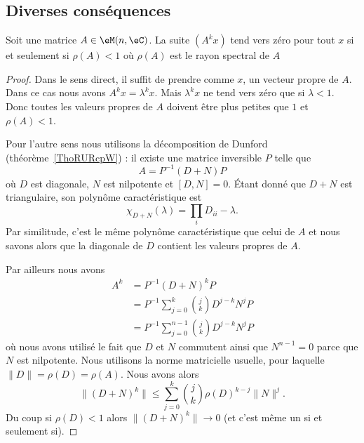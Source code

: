 \subsection{Diverses conséquences}

\begin{theorem}
    Soit une matrice \( A\in \eM(n,\eC)\). La suite \( (A^kx)\) tend vers zéro pour tout \( x\) si et seulement si \( \rho(A)<1\) où \( \rho(A)\) est le rayon spectral de $A$
\end{theorem}

\begin{proof}
    Dans le sens direct, il suffit de prendre comme \( x\), un vecteur propre de \( A\). Dans ce cas nous avons \( A^kx=\lambda^kx\). Mais \( \lambda^kx\) ne tend vers zéro que si \( \lambda<1\). Donc toutes les valeurs propres de \( A\) doivent être plus petites que \( 1\) et \( \rho(A)<1\).

    Pour l'autre sens nous utilisons la décomposition de Dunford (théorème~\ref{ThoRURcpW}) : il existe une matrice inversible \( P\) telle que
    \begin{equation}
        A=P^{-1}(D+N)P
    \end{equation}
    où \( D\) est diagonale, \( N\) est nilpotente et \( [D,N]=0\). Étant donné que \( D+N\) est triangulaire, son polynôme caractéristique est
    \begin{equation}
        \chi_{D+N}(\lambda)=\prod_i D_{ii}-\lambda.
    \end{equation}
    Par similitude, c'est le même polynôme caractéristique que celui de \( A\) et nous savons alors que la diagonale de \( D\) contient les valeurs propres de \( A\).

    Par ailleurs nous avons
    \begin{subequations}
        \begin{align}
            A^k&=P^{-1}(D+N)^kP\\
            &=P^{-1}\sum_{j=0}^k{j\choose k}D^{j-k}N^jP\\
            &=P^{-1}\sum_{j=0}^{n-1}{j\choose k}D^{j-k}N^jP
        \end{align}
    \end{subequations}
    où nous avons utilisé le fait que \( D\) et \( N\) commutent ainsi que \( N^{n-1}=0\) parce que \( N\) est nilpotente. Nous utilisons la norme matricielle usuelle, pour laquelle \( \| D \|=\rho(D)=\rho(A)\). Nous avons alors
    \begin{equation}
        \| (D+N)^k \|\leq \sum_{j=0}^k{j\choose k}\rho(D)^{k-j}\| N \|^j.
    \end{equation}
    Du coup si \( \rho(D)<1\) alors \( \| (D+N)^k \|\to 0\) (et c'est même un si et seulement si).
\end{proof}

